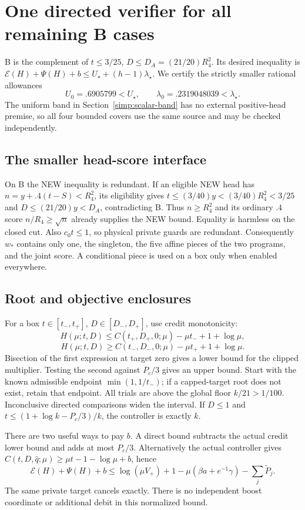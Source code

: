\section{One directed verifier for all remaining B cases}\label{simp:scalar-B}

B is the complement of $t\le3/25$, $D\le D_A=(21/20)R_4^2$.
Its desired inequality is
$\mathcal E(H)+\Psi(H)+b\le U_\star+(h-1)\lambda_\star$.
We certify the strictly smaller rational allowances
\[
 U_0=.6905799<U_\star,\qquad\lambda_0=.2319048039<\lambda_\star.
\]
The uniform band in Section~\ref{simp:scalar-band} has no external
positive-head premise, so all four bounded covers use the same source
and may be checked independently.

\subsection{The smaller head-score interface}

On B the NEW inequality is redundant. If an eligible NEW head has
$n=y+.4(t-S)<R_4^2$, its eligibility gives
$t\le(3/40)y<(3/40)R_4^2<3/25$ and
$D\le(21/20)y<D_A$, contradicting B. Thus $n\ge R_4^2$ and its
ordinary $.4$ score $n/R_4\ge\sqrt n$ already supplies the NEW bound.
Equality is harmless on the closed cut. Also $c_0t\le1$, so physical
private guards are redundant. Consequently $w_*$ contains only one,
the singleton, the five affine pieces of the two programs, and the joint
score. A conditional piece is used on a box only when enabled everywhere.

\subsection{Root and objective enclosures}

For a box $t\in[t_-,t_+]$, $D\in[D_-,D_+]$, use credit monotonicity:
\[
 H(\mu;t,D)\le C(t_+,D_+,0;\mu)-\mu t_-+1+\log\mu,
\]
\[
 H(\mu;t,D)\ge C(t_-,D_-,0;\mu)-\mu t_++1+\log\mu.
\]
Bisection of the first expression at target zero gives a lower bound
for the clipped multiplier. Testing the second against $P_c/3$ gives
an upper bound. Start with the known admissible endpoint $\min(1,1/t_-)$;
if a capped-target root does not exist, retain that endpoint.
All trials are above the global floor $k/21>1/100$. Inconclusive directed
comparisons widen the interval. If $D\le1$ and
$t\le(1+\log k-P_c/3)/k$, the controller is exactly $k$.

There are two useful ways to pay $b$. A direct bound subtracts the actual
credit lower bound and adds at most $P_c/3$. Alternatively the actual
controller gives $C(t,D,\widehat q;\mu)\ge\mu t-1-\log\mu+b$, hence
\begin{equation}\label{simp:normalized-bound}
 \mathcal E(H)+\Psi(H)+b
 \le\log(\mu V_+)+1-\mu(\beta a+e^{-1}\gamma)
                         -\sum_j\widetilde P_j.
\end{equation}
The same private target cancels exactly. There is no independent boost
coordinate or additional debit in this normalized bound.

